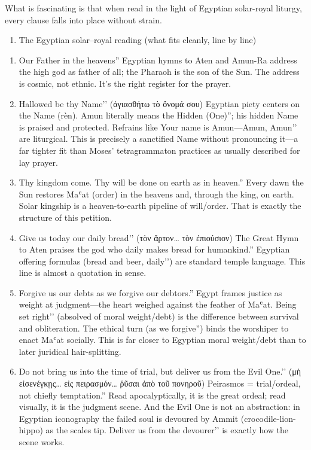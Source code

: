 What is fascinating is that when read in the light of Egyptian solar-royal liturgy, every clause falls into place without strain.
\begin{enumerate}
    \def\labelenumi{\arabic{enumi})}
    \setcounter{enumi}{2}
    \item
    The Egyptian solar–royal reading (what fits cleanly, line by line)
\end{enumerate}
\begin{enumerate}
    \def\labelenumi{(\alph{enumi})}
    \item
    Our Father in the heavens'' Egyptian hymns to Aten and Amun-Ra address the high god as father of all; the Pharaoh is the son of the Sun. The address is cosmic, not ethnic. It's the right register for the prayer.
    \item Hallowed be thy Name’’ (ἁγιασθήτω τὸ ὄνομά σου) Egyptian piety centers on the Name (rèn).
    Amun literally means the Hidden (One)''; his hidden Name is praised and protected. Refrains like Your name is Amun—Amun, Amun’’ are liturgical.
    This is precisely a sanctified Name without pronouncing it—a far tighter fit than Moses’ tetragrammaton practices as usually described for lay prayer.
    \item
    Thy kingdom come. Thy will be done on earth as in heaven.'' Every dawn the Sun restores Maʿat (order) in the heavens and, through the king, on earth. Solar kingship is a heaven-to-earth pipeline of will/order. That is exactly the structure of this petition.
    \item Give us today our daily bread’’ (τὸν ἄρτον\ldots{} τὸν ἐπιούσιον) The Great Hymn to Aten praises the god who daily makes bread for humankind.'' Egyptian offering formulas (bread and beer, daily’’) are standard temple language.
    This line is almost a quotation in sense.
    \item
    Forgive us our debts as we forgive our debtors.'' Egypt frames justice as weight at judgment---the heart weighed against the feather of Maʿat. Being set right’’ (absolved of moral weight/debt) is the difference between survival and obliteration.
    The ethical turn (as we forgive'') binds the worshiper to enact Maʿat socially. This is far closer to Egyptian moral weight/debt than to later juridical hair-splitting.
    \item Do not bring us into the time of trial, but deliver us from the Evil One.’’ (μὴ εἰσενέγκῃς\ldots{} εἰς πειρασμόν\ldots{} ῥῦσαι ἀπὸ τοῦ πονηροῦ) Peirasmos = trial/ordeal, not chiefly temptation.'' Read apocalyptically, it is the great ordeal; read visually, it is the judgment scene. And the Evil One is not an abstraction: in Egyptian iconography the failed soul is devoured by Ammit (crocodile-lion-hippo) as the scales tip. Deliver us from the devourer’’ is exactly how the scene works.

\end{enumerate}
